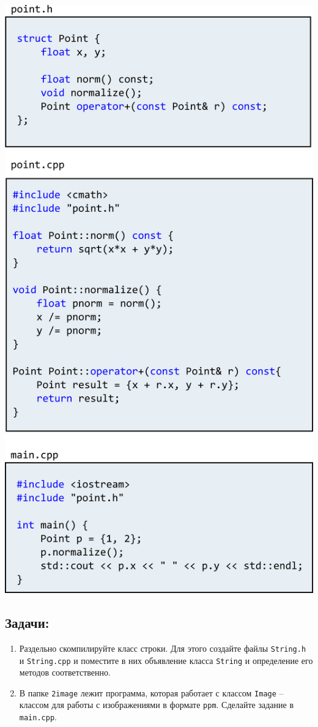 \documentclass{article}
\begin{document}
\begin{center}
\includegraphics[scale=0.65]{../images/sepcompilation.png}
\end{center}

\subsection*{Задачи:}
\begin{enumerate}
\item Раздельно скомпилируйте класс строки. Для этого создайте файлы \texttt{String.h} и \texttt{String.cpp} и поместите в них объявление класса \texttt{String} и определение его методов соответственно.
\item В папке \texttt{2image} лежит программа, которая работает с классом \texttt{Image} -- классом для работы с изображениями в формате \texttt{ppm}. Сделайте задание в \texttt{main.cpp}.
\end{enumerate}
\end{document}
